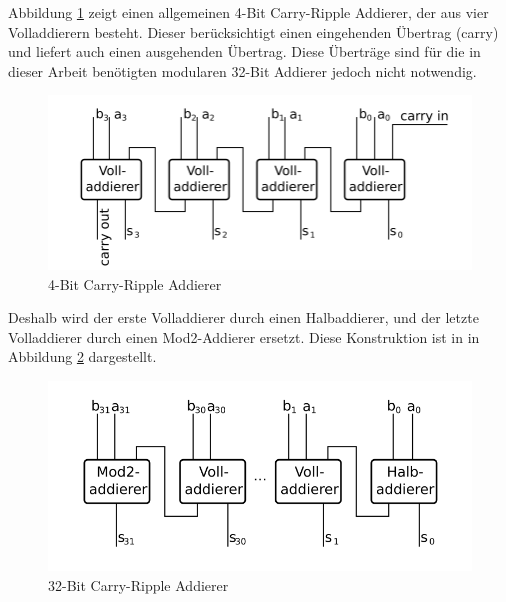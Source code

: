 Abbildung \ref{fig:carryrippleadder4} zeigt einen allgemeinen 4-Bit Carry-Ripple Addierer, der aus vier Volladdierern besteht. Dieser berücksichtigt einen eingehenden
Übertrag (carry) und liefert auch einen ausgehenden Übertrag. Diese Überträge sind für die in dieser Arbeit benötigten modularen 32-Bit Addierer jedoch nicht notwendig.
\begin{figure}[!h]
  \centering
  \includegraphics[scale=0.8]{images/carryrippleadder4}
  \caption[4-Bit Carry-Ripple Addierer]{4-Bit Carry-Ripple Addierer\protect\footnotemark}
  \label{fig:carryrippleadder4}
\end{figure}

Deshalb wird der erste Volladdierer durch einen Halbaddierer, und der letzte Volladdierer durch einen Mod2-Addierer ersetzt.
Diese Konstruktion ist in in Abbildung \ref{fig:carryrippleadder32} dargestellt. \clearpage
\begin{figure}[!h]
  \centering
  \includegraphics[scale=0.8]{images/carryrippleadder32}
  \caption[32-Bit Carry-Ripple Addierer]{32-Bit Carry-Ripple Addierer\protect\footnotemark}
  \label{fig:carryrippleadder32}
\end{figure}

